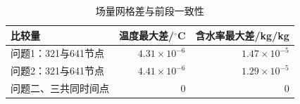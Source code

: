 \begin{table}[!htbp]\centering
\small
\caption{场量网格差与前段一致性}
\begin{tabular}{lrr}\toprule
比较量 & 温度最大差/$^\circ$C & 含水率最大差/kg/kg\\\midrule
问题1：321与641节点 & $4.31\times10^{-6}$ & $1.47\times10^{-5}$\\
问题2：321与641节点 & $4.41\times10^{-6}$ & $1.29\times10^{-5}$\\
问题二、三共同时间点 & 0 & 0\\
\bottomrule\end{tabular}\end{table}
